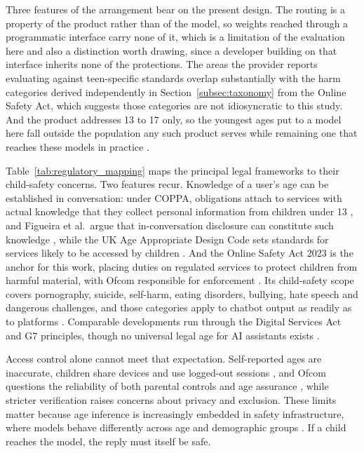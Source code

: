 Three features of the arrangement bear on the present design. The routing is a
property of the product rather than of the model, so weights reached through a
programmatic interface carry none of it, which is a limitation of the evaluation
here and also a distinction worth drawing, since a developer building on that
interface inherits none of the protections. The areas the provider reports
evaluating against teen-specific standards overlap substantially with the harm
categories derived independently in Section~\ref{subsec:taxonomy} from the Online
Safety Act, which suggests those categories are not idiosyncratic to this study.
And the product addresses 13 to 17 only, so the youngest ages put to a model here
fall outside the population any such product serves while remaining one that
reaches these models in practice \cite{ChatGPTTeens}.

Table~\ref{tab:regulatory_mapping} maps the principal legal frameworks to their
child-safety concerns. Two features recur. Knowledge of a user's age can be
established in conversation: under COPPA, obligations attach to services with
actual knowledge that they collect personal information from children under 13
\cite{ChildrensOnlinePrivacy2013}, and Figueira et al.\ argue that
in-conversation disclosure can constitute such knowledge
\cite{figueiraActionsSpeakLouder2026}, while the UK Age Appropriate Design Code
sets standards for services likely to be accessed by children
\cite{UKAgeAppropriate2021}. And the Online Safety Act 2023 is the anchor for
this work, placing duties on regulated services to protect children from harmful
material, with Ofcom responsible for enforcement \cite{OnlineSafetyAct2025,
WhatOnlineSafety2024, OfcomAnnualReport}. Its child-safety scope covers
pornography, suicide, self-harm, eating disorders, bullying, hate speech and
dangerous challenges, and those categories apply to chatbot output as readily as
to platforms \cite{WhatOnlineSafety2024}. Comparable developments run through the
Digital Services Act and G7 principles, though no universal legal age for AI
assistants exists \cite{EULawmakersMust2026, ReaffirmingOurCommitment2026,
G7NationsAgree, ListCountriesRegions, FiveBigQuestions2026, SocialMediaBe2026,
StarmerAnnouncesSocial2026}.



Access control alone cannot meet that expectation. Self-reported ages are
inaccurate, children share devices and use logged-out sessions
\cite{ChildrensMediaLives2026}, and Ofcom questions the reliability of both
parental controls and age assurance \cite{WhatOnlineSafety2024,
OfcomAnnualReport, AgeChecksHelping2026}, while stricter verification raises
concerns about privacy and exclusion. These limits matter because age inference
is increasingly embedded in safety infrastructure, where models behave
differently across age and demographic groups \cite{caoAGRAgeGroup2024,
maLargeLanguageModelbased2025, yuPrinciplesSafeAI2025}. If a child reaches the
model, the reply must itself be safe.

